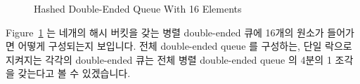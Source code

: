\begin{figure}[tb]
\centering
{}
\caption{Hashed Double-Ended Queue With 16 Elements}
\label{fig:SMPdesign:Hashed Double-Ended Queue With 16 Elements}
\end{figure}

Figure~\ref{fig:SMPdesign:Hashed Double-Ended Queue With 16 Elements} 는 네개의
해시 버킷을 갖는 병렬 double-ended 큐에 16개의 원소가 들어가면 어떻게
구성되는지 보입니다.
전체 double-ended queue 를 구성하는, 단일 락으로 지켜지는 각각의 double-ended
큐는 전체 병렬 double-ended queue 의 4분의 1 조각을 갖는다고 볼 수 있겠습니다.

